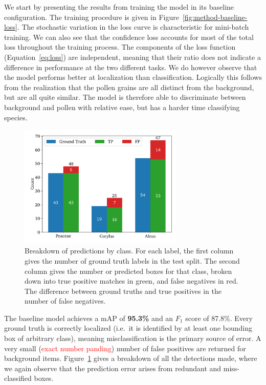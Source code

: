 We start by presenting the results from training the model in its baseline configuration. 
The training procedure is given in Figure~\ref{fig:method-baseline-loss}.
The stochastic variation in the loss curve is characteristic for mini-batch training. 
We can also see that the confidence loss accounts for most of the total loss throughout the training process.
The components of the loss function (Equation~\ref{eq:loss}) are independent, meaning that their ratio does not indicate a difference in performance at the two different tasks.
We do however observe that the model performs better at localization than classification.
Logically this follows from the realization that the pollen grains are all distinct from the background, but are all quite similar.
The model is therefore able to discriminate between background and pollen with relative ease, but has a harder time classifying species.

\begin{figure}[htb]
    \centering
    \includegraphics[width=0.7\textwidth]{figs/method/baseline/detections_test.pdf}
    \caption[Detections by type by class for the baseline on the test split]{%
Breakdown of predictions by class.
For each label, the first column gives the number of ground truth labels in the test split.
The second column gives the number or predicted boxes for that class, broken down into true positive matches in green, and false negatives in red.
The difference between ground truths and true positives in the number of false negatives. 
    }\label{fig:method-baseline-detections}
  \end{figure}

The baseline model achieves a mAP of \textbf{95.3\%} and an \(F_1\) score of 87.8\%.
Every ground truth is correctly localized (i.e.~it is identified by at least one bounding box of arbitrary class), meaning misclassification is the primary source of error.
A very small (\textcolor{red}{exact number panding}) number of false positives are returned for background items.
Figure~\ref{fig:method-baseline-detections} gives a breakdown of all the detections made, where we again observe that the prediction error arises from redundant and miss-classified boxes.

